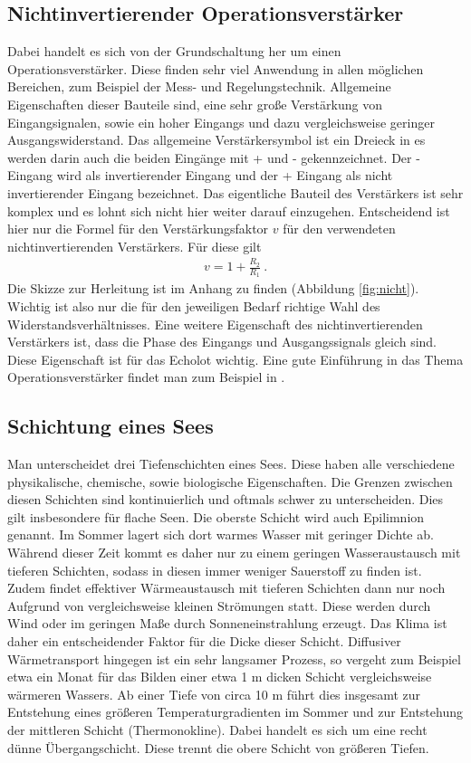 \documentclass[12pt,a4paper,titlepage,headinclude,bibtotoc]{scrartcl}
\numberwithin{equation}{subsection}
\begin{document}
\subsection{Nichtinvertierender Operationsverstärker}
\label{sec:teoverstaerker}
Dabei handelt es sich von der Grundschaltung her um einen Operationsverstärker.
Diese finden sehr viel Anwendung in allen möglichen Bereichen, zum Beispiel der Mess- und Regelungstechnik. 
Allgemeine Eigenschaften dieser Bauteile sind, eine sehr große Verstärkung von Eingangsignalen, sowie ein hoher Eingangs und dazu vergleichsweise geringer Ausgangswiderstand.
Das allgemeine Verstärkersymbol ist ein Dreieck in es werden darin auch die beiden
Eingänge mit + und - gekennzeichnet.
Der - Eingang wird als invertierender Eingang und 
der + Eingang als nicht invertierender Eingang bezeichnet.
Das eigentliche Bauteil des Verstärkers ist sehr komplex und es lohnt sich nicht hier 
weiter darauf einzugehen.
Entscheidend ist hier nur die Formel für den Verstärkungsfaktor $v$ für den verwendeten 
nichtinvertierenden Verstärkers. 
Für diese gilt
\begin{align}
 v = 1 + \frac{R_2}{R_1}~.\label{eq:verst}
\end{align}
Die Skizze zur Herleitung ist im Anhang zu finden (Abbildung \ref{fig:nicht}).
Wichtig ist also nur die für den jeweiligen Bedarf richtige Wahl des Widerstandsverhältnisses.
Eine weitere Eigenschaft des nichtinvertierenden Verstärkers ist, dass die Phase des Eingangs und Ausgangssignals gleich sind.
Diese Eigenschaft ist für das Echolot wichtig. Eine gute Einführung in das Thema Operationsverstärker findet man zum Beispiel in \cite{op}.


\subsection{Schichtung eines Sees}

Man unterscheidet drei Tiefenschichten eines Sees.
Diese haben alle verschiedene physikalische, chemische, sowie biologische Eigenschaften.
Die Grenzen zwischen diesen Schichten sind kontinuierlich und oftmals schwer zu unterscheiden. 
Dies gilt insbesondere für flache Seen.
Die oberste Schicht wird auch Epilimnion genannt. 
Im Sommer lagert sich dort warmes Wasser mit geringer Dichte ab.
Während dieser Zeit kommt es daher nur zu einem geringen Wasseraustausch mit tieferen Schichten, sodass in diesen immer weniger Sauerstoff zu finden ist.
Zudem findet effektiver Wärmeaustausch mit tieferen Schichten dann nur noch Aufgrund von vergleichsweise kleinen Strömungen statt.
Diese werden durch Wind oder im geringen Maße durch Sonneneinstrahlung erzeugt. 
Das Klima ist daher ein entscheidender Faktor für die Dicke dieser Schicht.
Diffusiver Wärmetransport hingegen ist ein sehr langsamer Prozess, so vergeht zum Beispiel etwa ein Monat für das Bilden einer etwa 1 m dicken Schicht vergleichsweise wärmeren Wassers.
Ab einer Tiefe von circa 10 m führt dies insgesamt zur Entstehung eines größeren Temperaturgradienten im Sommer und zur Entstehung der mittleren Schicht (Thermonokline).
Dabei handelt es sich um eine recht dünne Übergangschicht.
Diese trennt die obere Schicht von größeren Tiefen. 
\newline
\end{document}
